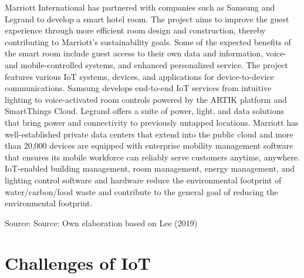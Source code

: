 \documentclass[
  letterpaper,
  DIV=11,
  numbers=noendperiod]{scrreprt}
\begin{document}
\begin{tcolorbox}[enhanced jigsaw, title=\textcolor{quarto-callout-note-color}{\faInfo}\hspace{0.5em}{Marriott International IoT}, colframe=quarto-callout-note-color-frame, arc=.35mm, colbacktitle=quarto-callout-note-color!10!white, rightrule=.15mm, titlerule=0mm, toptitle=1mm, opacitybacktitle=0.6, bottomtitle=1mm, colback=white, leftrule=.75mm, bottomrule=.15mm, breakable, left=2mm, toprule=.15mm, opacityback=0, coltitle=black]

Marriott International has partnered with companies such as Samsung and
Legrand to develop a smart hotel room. The project aims to improve the
guest experience through more efficient room design and construction,
thereby contributing to Marriott's sustainability goals. Some of the
expected benefits of the smart room include guest access to their own
data and information, voice- and mobile-controlled systems, and enhanced
personalized service. The project features various IoT systems, devices,
and applications for device-to-device communications. Samsung develops
end-to-end IoT services from intuitive lighting to voice-activated room
controls powered by the ARTIK platform and SmartThings Cloud. Legrand
offers a suite of power, light, and data solutions that bring power and
connectivity to previously untapped locations. Marriott has
well-established private data centers that extend into the public cloud
and more than 20,000 devices are equipped with enterprise mobility
management software that ensures its mobile workforce can reliably serve
customers anytime, anywhere. IoT-enabled building management, room
management, energy management, and lighting control software and
hardware reduce the environmental footprint of water/carbon/food waste
and contribute to the general goal of reducing the environmental
footprint.

Source: Source: Own elaboration based on Lee (2019)

\end{tcolorbox}

\hypertarget{challenges-of-iot}{%
\section{Challenges of IoT}\label{challenges-of-iot}}
\end{document}
